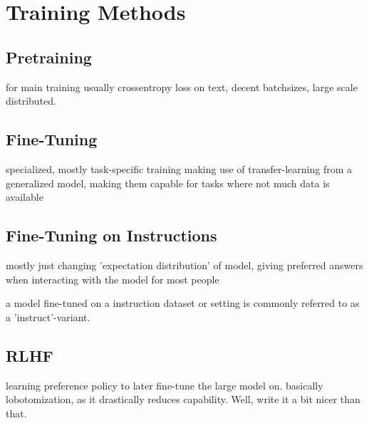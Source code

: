 \section{Training Methods}\label{sec:training}

\subsection{Pretraining}\label{sub:pretraining}
for main training usually crossentropy loss on text, decent batchsizes, large scale distributed.

\subsection{Fine-Tuning}\label{sub:finetune}
specialized, mostly task-specific training making use of transfer-learning from a generalized model, making them capable for tasks where not much data is available

\subsection{Fine-Tuning on Instructions}\label{sub:instruct}
mostly just changing 'expectation distribution' of model, giving preferred answers when interacting with the model for most people

a model fine-tuned on a instruction dataset or setting is commonly referred to as a 'instruct'-variant.

\subsection{RLHF}\label{sub:rlhf}
learning preference policy to later fine-tune the large model on. basically lobotomization, as it drastically reduces capability.
Well, write it a bit nicer than that.
